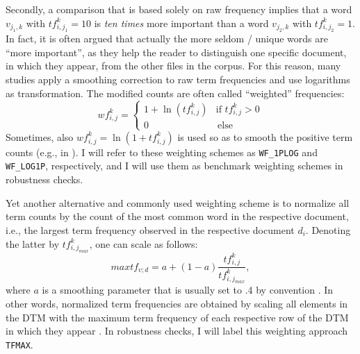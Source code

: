 Secondly, a comparison that is based solely on raw frequency implies that a word $v_{j_1,k}$ with $tf_{i,j_1}^k = 10$ is \textit{ten times} more important than a word $v_{j_2,k}$ with $tf_{i,j_2}^k= 1$. In fact, it is often argued that actually the more seldom / unique words are \enquote{more important}, as they help the reader to distinguish one specific document, in which they appear, from the other files in the corpus. For this reason, many studies apply a smoothing correction to raw term frequencies and use logarithms as transformation. The modified counts are often called \enquote{weighted} frequencies:
\begin{equation} \label{eq: wf}
wf_{i,j}^k = \begin{cases}
1 + \ln (tf_{i,j}^k) & \text{if } tf_{i,j}^k > 0 \\
0 & \, \text{else}
\end{cases}
\end{equation}
Sometimes, also $wf_{i,j}^k = \ln (1 + tf_{i,j}^k)$ is used so as to smooth the positive term counts (e.g., in \textcite{Rekabsaz2017}). I will refer to these weighting schemes as \texttt{WF\_1PLOG} and \texttt{WF\_LOG1P},  respectively, and I will use them as benchmark weighting schemes in robustness checks. 

Yet another alternative and commonly used weighting scheme is to  normalize all term counts by the count of the most common word in the respective document, i.e., the largest term frequency observed in the respective document $d_i$. Denoting the latter by $tf_{i, j_{max}}^k$, one can scale as follows:
 \begin{equation}
 maxtf_{v;d} = a + (1-a) \dfrac{ tf_{i,j}^k }{  tf_{i, j_{max}}^k   },
\end{equation}
where $a$ is a smoothing parameter that is usually set to .4 by convention \parencite[127]{ManningSchutze_IR_2008}. In other words, normalized term frequencies are obtained by scaling all elements in the DTM with the maximum term frequency of each respective row of the DTM in which they appear \parencite[126-127]{ManningSchutze_IR_2008}. In robustness checks, I will label this weighting approach \texttt{TFMAX}. 


